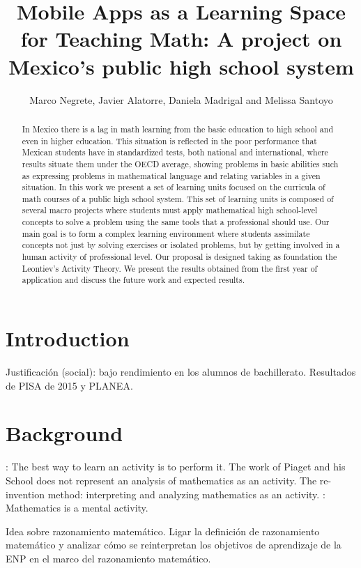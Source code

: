 \documentclass[a4paper, 10pt]{article}
\title{Mobile Apps as a Learning Space for Teaching Math: A project on Mexico's public high school system}
\author{Marco Negrete, Javier Alatorre, Daniela Madrigal and Melissa Santoyo}
\date{}
\begin{document}
\maketitle
\begin{abstract}
In Mexico there is a lag in math learning from the basic education to high school and even in higher education. This situation is reflected in the poor performance that Mexican students have in standardized tests, both national and international, where results situate them under the OECD average, showing problems in basic abilities such as expressing problems in mathematical language and relating variables in a given situation. In this work we present a set of learning units focused on the curricula of math courses of a public high school system. This set of learning units is composed of several macro projects where students must apply mathematical high school-level concepts to solve a problem using the same tools that a professional should use. Our main goal is to form a complex learning environment where students assimilate concepts not just by solving exercises or isolated problems, but by getting involved in a human activity of professional level. Our proposal is designed taking as foundation the Leontiev's Activity Theory. We present the results obtained from the first year of application and discuss the future work and expected results. 
\end{abstract}

\section{Introduction}
Justificación (social): bajo rendimiento en los alumnos de bachillerato. Resultados de PISA de 2015 y PLANEA. 

\section{Background}
\cite{freudenthal1973math}: The best way to learn an activity is to perform it. The work of Piaget and his School does not represent an analysis of mathematics as an activity. The re-invention method: interpreting and analyzing mathematics as an activity.  
\cite{freudenthal2002math}: Mathematics is a mental activity. 



Idea sobre razonamiento matemático. Ligar la definición de razonamiento matemático y analizar cómo se reinterpretan los objetivos de aprendizaje de la ENP en el marco del razonamiento matemático. 
\end{document}
